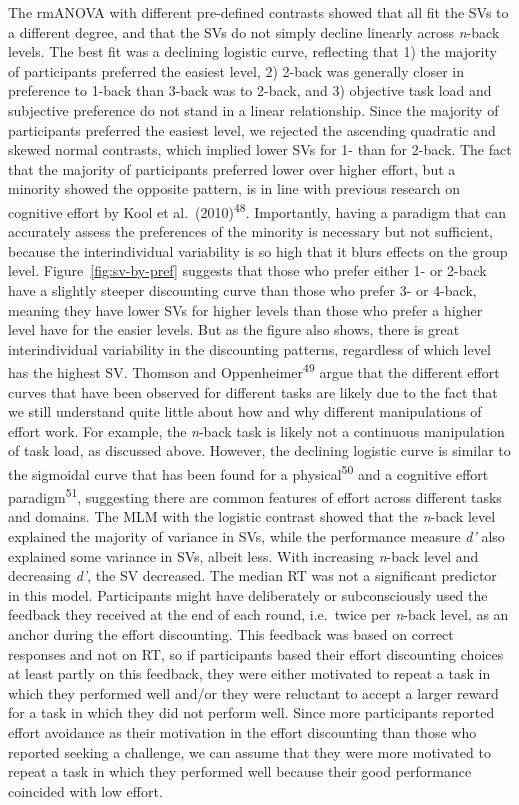 \documentclass[
  man,floatsintext]{apa6}
\begin{document}
The rmANOVA with different pre-defined contrasts showed that all fit the SVs to a different degree, and that the SVs do not simply decline linearly across \emph{n}-back levels.
The best fit was a declining logistic curve, reflecting that 1) the majority of participants preferred the easiest level, 2) 2-back was generally closer in preference to 1-back than 3-back was to 2-back, and 3) objective task load and subjective preference do not stand in a linear relationship.
Since the majority of participants preferred the easiest level, we rejected the ascending quadratic and skewed normal contrasts, which implied lower SVs for 1- than for 2-back.
The fact that the majority of participants preferred lower over higher effort, but a minority showed the opposite pattern, is in line with previous research on cognitive effort by Kool et al.~(2010)\textsuperscript{48}.
Importantly, having a paradigm that can accurately assess the preferences of the minority is necessary but not sufficient, because the interindividual variability is so high that it blurs effects on the group level.
Figure~\ref{fig:sv-by-pref} suggests that those who prefer either 1- or 2-back have a slightly steeper discounting curve than those who prefer 3- or 4-back, meaning they have lower SVs for higher levels than those who prefer a higher level have for the easier levels.
But as the figure also shows, there is great interindividual variability in the discounting patterns, regardless of which level has the highest SV.
Thomson and Oppenheimer\textsuperscript{49} argue that the different effort curves that have been observed for different tasks are likely due to the fact that we still understand quite little about how and why different manipulations of effort work.
For example, the \emph{n}-back task is likely not a continuous manipulation of task load, as discussed above.
However, the declining logistic curve is similar to the sigmoidal curve that has been found for a physical\textsuperscript{50} and a cognitive effort paradigm\textsuperscript{51}, suggesting there are common features of effort across different tasks and domains.
The MLM with the logistic contrast showed that the \emph{n}-back level explained the majority of variance in SVs, while the performance measure \emph{d'} also explained some variance in SVs, albeit less.
With increasing \emph{n}-back level and decreasing \emph{d'}, the SV decreased.
The median RT was not a significant predictor in this model.
Participants might have deliberately or subconsciously used the feedback they received at the end of each round, i.e.~twice per \emph{n}-back level, as an anchor during the effort discounting.
This feedback was based on correct responses and not on RT, so if participants based their effort discounting choices at least partly on this feedback, they were either motivated to repeat a task in which they performed well and/or they were reluctant to accept a larger reward for a task in which they did not perform well.
Since more participants reported effort avoidance as their motivation in the effort discounting than those who reported seeking a challenge, we can assume that they were more motivated to repeat a task in which they performed well because their good performance coincided with low effort.
\end{document}
